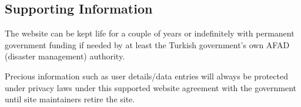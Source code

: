 \subsection{Supporting Information}

The website can be kept life for a couple of years or indefinitely with permanent government funding if needed by at least the Turkish government's own AFAD (disaster management) authority.

Precious information such as user details/data entries will always be protected under privacy laws under this supported website agreement with the government until site maintainers retire the site. 
